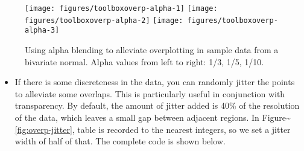 \begin{figure}
\texttt{[image: figures/toolboxoverp-alpha-1]} \texttt{[image: figures/toolboxoverp-alpha-2]} \texttt{[image: figures/toolboxoverp-alpha-3]} \caption{Using alpha blending to alleviate overplotting in sample data from a bivariate normal.  Alpha values from left to right: 1/3, 1/5, 1/10.\label{fig:overp-alpha}}
\end{figure}

\begin{itemize}
\itemsep1pt\parskip0pt
\item
  If there is some discreteness in the data, you can randomly jitter the
  points to alleviate some overlaps. This is particularly useful in
  conjunction with transparency. By default, the amount of jitter added
  is 40\% of the resolution of the data, which leaves a small gap
  between adjacent regions. In
  Figure\textasciitilde{}\ref{fig:overp-jitter}, table is recorded to
  the nearest integers, so we set a jitter width of half of that. The
  complete code is shown below.  
\end{itemize}

\begin{Shaded}
\begin{Highlighting}[]
\StringTok{ }\StringTok{ }
\StringTok{  }\NormalTok{(}\NormalTok{, }\NormalTok{) +}\StringTok{ }\NormalTok{(}\NormalTok{, }\NormalTok{)}
\StringTok{ }\NormalTok{()}
\StringTok{ }\NormalTok{()}
\StringTok{ }\NormalTok{(} \NormalTok{)}
\StringTok{ }\NormalTok{(} 
\StringTok{ }\NormalTok{(}  \NormalTok{/}\NormalTok{)}
\StringTok{ }\NormalTok{(}  \NormalTok{/}\NormalTok{)}
\StringTok{ }\NormalTok{(}  \NormalTok{/}\NormalTok{)}
\end{Highlighting}
\end{Shaded}

